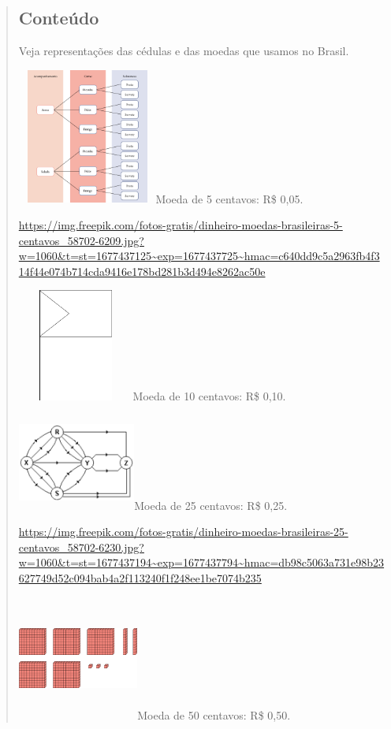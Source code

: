 \begin{enumerate}
\begin{escolha}
\begin{enumerate}
\begin{itemize}
\begin{itemize}
\begin{escolha}
\begin{quote}
\subsection{Conteúdo}\label{conteuxfado-5}
Veja representações das cédulas e das moedas que usamos no Brasil.

\includegraphics[width=1.80833in,height=1.75637in]{media/image73.png}Moeda
de 5 centavos: R\$ 0,05.

\url{https://img.freepik.com/fotos-gratis/dinheiro-moedas-brasileiras-5-centavos_58702-6209.jpg?w=1060\&t=st=1677437125~exp=1677437725~hmac=c640dd9c5a2963fb4f314f44e074b714cda9416e178bd281b3d494e8262ac50e}

\includegraphics[width=1.50833in,height=1.45668in]{media/image74.png}Moeda
de 10 centavos: R\$ 0,10.

\includegraphics[width=1.52500in,height=1.24749in]{media/image75.png}Moeda
de 25 centavos: R\$ 0,25.

\url{https://img.freepik.com/fotos-gratis/dinheiro-moedas-brasileiras-25-centavos_58702-6230.jpg?w=1060\&t=st=1677437194~exp=1677437794~hmac=db98c5063a731e98b23627749d52c094bab4a2f113240f1f248ee1be7074b235}

\includegraphics[width=1.56667in,height=1.61849in]{media/image76.png}Moeda
de 50 centavos: R\$ 0,50.


\end{quote}
\end{escolha}
\end{itemize}
\end{itemize}
\end{enumerate}
\end{escolha}
\end{enumerate}
